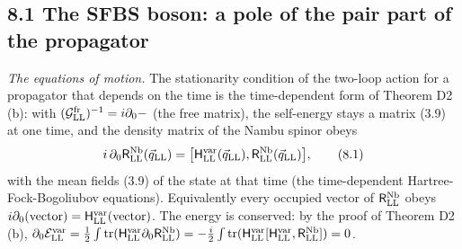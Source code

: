 \documentclass[
  10pt,
]{article}
\begin{document}
\hypertarget{the-sfbs-boson-a-pole-of-the-pair-part-of-the-propagator}{%
\subsection{8.1 The SFBS boson: a pole of the pair part of the
propagator}\label{the-sfbs-boson-a-pole-of-the-pair-part-of-the-propagator}}

\emph{The equations of motion.} The stationarity condition of the
two-loop action for a propagator that depends on the time is the
time-dependent form of Theorem D2 (b): with
\((\mathcal G^{\rm fr}_{\rm LL})^{-1}=i\partial_0-\) (the free matrix),
the self-energy stays a matrix (3.9) at one time, and the density matrix
of the Nambu spinor obeys
\[i\,\partial_0\mathsf R^{\rm Nb}_{\rm LL}(\vec q_{\rm LL})=\big[\mathsf H^{\rm var}_{\rm LL}(\vec q_{\rm LL}),\mathsf R^{\rm Nb}_{\rm LL}(\vec q_{\rm LL})\big],\tag{8.1}\]
with the mean fields (3.9) of the state at that time (the time-dependent
Hartree-Fock-Bogoliubov equations). Equivalently every occupied vector
of \(\mathsf R^{\rm Nb}_{\rm LL}\) obeys
\(i\partial_0(\text{vector})=\mathsf H^{\rm var}_{\rm LL}(\text{vector})\).
The energy is conserved: by the proof of Theorem D2 (b),
\(\partial_0\mathcal E^{\rm var}_{\rm LL}=\tfrac12\int\mathrm{tr}(\mathsf H^{\rm var}_{\rm LL}\partial_0\mathsf R^{\rm Nb}_{\rm LL}) =-\tfrac i2\int\mathrm{tr}(\mathsf H^{\rm var}_{\rm LL}[\mathsf H^{\rm var}_{\rm LL},\mathsf R^{\rm Nb}_{\rm LL}])=0\).
\end{document}
